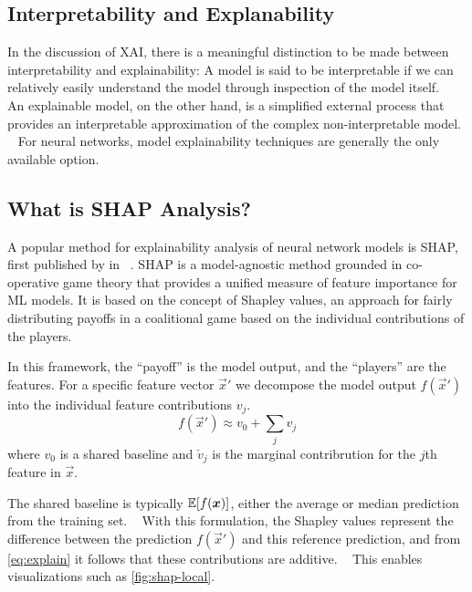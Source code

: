 \subsection{Interpretability and Explanability}

In the discussion of \ac{XAI}, there is 
a meaningful distinction to be made between 
interpretability and explainability:
A model is said to be interpretable if we can 
relatively easily understand the model through inspection
of the model itself.
~\autocite{russellArtificial2009}
An explainable model, on the other hand, is a simplified 
external process that provides an interpretable approximation
of the complex non-interpretable model.
~\autocite{lundbergUnified2017}
For neural networks,
model explainability techniques are generally 
the only available option.

\subsection{What is SHAP Analysis?} 
\label{sub:what-is-shap}

A popular method for explainability analysis of neural network models
is \ac{SHAP}, first published by
\citeauthor{lundbergUnified2017} in \citeyear{lundbergUnified2017}
~\autocite{lundbergUnified2017}.
SHAP is a model-agnostic method grounded in co-operative game theory
that provides a unified measure of feature importance for \ac{ML} models.
It is based on the concept of Shapley values,  
an approach for fairly distributing payoffs in a coalitional game
based on the individual contributions of the players.
~\autocite{shapley1953value}

In this framework, 
the \enquote{payoff} is the model output, 
and the \enquote{players} are the features.
For a specific feature vector 
\(\vec{x}'\) 
we decompose the model output \(f(\vec{x}')\)
into the individual feature contributions \(v_{j}\).
~\autocite{aasExplaining2020}
\begin{equation}
    \label{eq:explain}
    f(\vec{x}') \approx v_0 + \sum_{j} v_{j}
\end{equation}
where \(v_0\) is a shared baseline and 
\(\check{v}_{j}\) is the marginal contribrution for the \(j\)th 
feature in \( \vec{x}\).

The shared baseline is typically \(\operatorname{\mathbb{E}}[f(\bm{x})]\), 
either the average or median prediction from the training set.
~\autocite{aasExplaining2020}
With this formulation, the Shapley values represent the difference between
the prediction \(f(\vec{x}')\) and this reference prediction,
and from \cref{eq:explain} it follows that these contributions are additive.
~\autocite{aasExplaining2020}
This enables visualizations such as \cref{fig:shap-local}.

